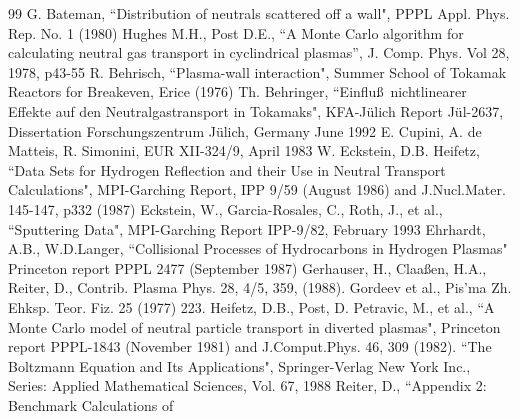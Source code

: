 
\begin{thebibliography}{99}
 G. Bateman, ``Distribution of neutrals scattered off a wall",
                     PPPL Appl. Phys. Rep. No. 1 (1980)
 Hughes M.H., Post D.E., ``A Monte Carlo
                    algorithm for calculating neutral gas transport in cyclindrical
                    plasmas'', J. Comp. Phys. Vol 28, 1978, p43-55
 R. Behrisch, ``Plasma-wall interaction", Summer School of Tokamak Reactors
                      for Breakeven, Erice (1976)
 Th. Behringer, ``Einflu\ss \ nichtlinearer Effekte
                       auf den Neutralgastransport in Tokamaks",
                       KFA-J\"ulich Report J\"ul-2637, Dissertation
                       Forschungszentrum J\"ulich, Germany June 1992
 E. Cupini, A. de Matteis, R. Simonini, EUR XII-324/9,
                    April 1983
 W. Eckstein, D.B. Heifetz, ``Data Sets for Hydrogen Reflection and their
                      Use in Neutral Transport Calculations",
                      MPI-Garching Report, IPP 9/59 (August 1986) and J.Nucl.Mater. 145-147, p332
                      (1987)
  Eckstein, W., Garcia-Rosales, C., Roth, J., et al.,
                       ``Sputtering Data",
                       MPI-Garching Report IPP-9/82, February 1993
  Ehrhardt, A.B., W.D.Langer,
                       ``Collisional Processes of Hydrocarbons in Hydrogen Plasmas"
                       Princeton report PPPL 2477 (September 1987)
 Gerhauser, H., Claa\ss en, H.A., Reiter, D.,
                          Contrib. Plasma  Phys. 28, 4/5, 359, (1988).
 Gordeev et al., Pis'ma Zh. Ehksp. Teor. Fiz. 25 (1977) 223.
 Heifetz, D.B., Post, D. Petravic, M.,
                     et al., ``A Monte Carlo model of neutral particle transport
                    in diverted plasmas",
                    Princeton report PPPL-1843 (November 1981) and
                     J.Comput.Phys. 46, 309 (1982).
 ``The Boltzmann Equation and Its Applications",
                     Springer-Verlag New York Inc.,
                     Series: Applied Mathematical Sciences, Vol. 67,  1988
 Reiter, D., ``Appendix 2: Benchmark Calculations of

\end{thebibliography}
